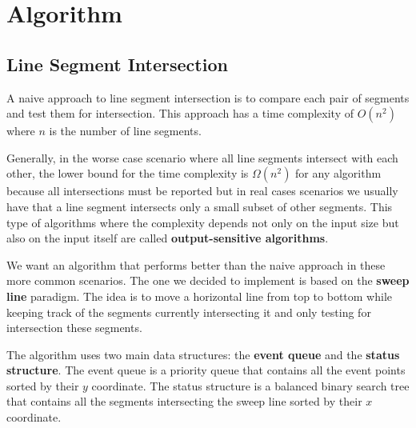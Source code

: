 \section{Algorithm}
\label{sec:algorithm}
\subsection{Line Segment Intersection}
\label{sec:line_segment_intersection}
A naive approach to line segment intersection is to compare each pair of segments and test them for intersection. This approach has a time complexity of $O(n^2)$ where $n$ is the number of line segments.

Generally, in the worse case scenario where all line segments intersect with each other, the lower bound for the time complexity is $\Omega(n^2)$ for any algorithm because all intersections must be reported but in real cases scenarios we usually have that a line segment intersects only a small subset of other segments. This type of algorithms where the complexity depends not only on the input size but also on the input itself are called \textbf{output-sensitive algorithms}.

We want an algorithm that performs better than the naive approach in these more common scenarios. The one we decided to implement is based on the \textbf{sweep line} paradigm. The idea is to move a horizontal line from top to bottom while keeping track of the segments currently intersecting it and only testing for intersection these segments.

The algorithm uses two main data structures: the \textbf{event queue} and the \textbf{status structure}. The event queue is a priority queue that contains all the event points sorted by their $y$ coordinate. The status structure is a balanced binary search tree that contains all the segments intersecting the sweep line sorted by their $x$ coordinate.

